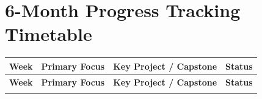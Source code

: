 \documentclass[11pt, a4paper]{article}
\begin{document}
\section{6-Month Progress Tracking Timetable}

\begin{center}
\renewcommand{\arraystretch}{1.5}
\begin{longtable}{@{} c l p{7cm} c @{}}
\toprule
\textbf{Week} & \textbf{Primary Focus} & \textbf{Key Project / Capstone} & \textbf{Status} \\ 
\midrule
\endfirsthead

\toprule
\textbf{Week} & \textbf{Primary Focus} & \textbf{Key Project / Capstone} & \textbf{Status} \\ 
\midrule
\endhead

\bottomrule
\endfoot

\bottomrule
\endlastfoot


\end{longtable}
\end{center}
\end{document}
